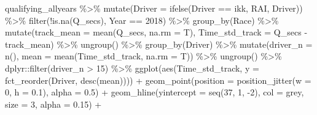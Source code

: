 \documentclass[
]{book}
\newenvironment{Shaded}{\begin{snugshade}}{\end{snugshade}}
\newcommand{\AttributeTok}[1]{\textcolor[rgb]{0.77,0.63,0.00}{#1}}
\newcommand{\DecValTok}[1]{\textcolor[rgb]{0.00,0.00,0.81}{#1}}
\newcommand{\FloatTok}[1]{\textcolor[rgb]{0.00,0.00,0.81}{#1}}
\newcommand{\FunctionTok}[1]{\textcolor[rgb]{0.00,0.00,0.00}{#1}}
\newcommand{\NormalTok}[1]{#1}
\newcommand{\SpecialCharTok}[1]{\textcolor[rgb]{0.00,0.00,0.00}{#1}}
\newcommand{\StringTok}[1]{\textcolor[rgb]{0.31,0.60,0.02}{#1}}
\begin{document}
\begin{Shaded}
\begin{Highlighting}[]
\NormalTok{qualifying\_allyears }\SpecialCharTok{\%\textgreater{}\%}
  \FunctionTok{mutate}\NormalTok{(}\AttributeTok{Driver =} \FunctionTok{ifelse}\NormalTok{(Driver }\SpecialCharTok{==} \StringTok{\textquotesingle{}ikk\textquotesingle{}}\NormalTok{, }\StringTok{\textquotesingle{}RAI\textquotesingle{}}\NormalTok{, Driver)) }\SpecialCharTok{\%\textgreater{}\%} 
  \FunctionTok{filter}\NormalTok{(}\SpecialCharTok{!}\FunctionTok{is.na}\NormalTok{(Q\_secs),}
\NormalTok{         Year }\SpecialCharTok{==} \DecValTok{2018}\NormalTok{) }\SpecialCharTok{\%\textgreater{}\%}
  \FunctionTok{group\_by}\NormalTok{(Race) }\SpecialCharTok{\%\textgreater{}\%}
  \FunctionTok{mutate}\NormalTok{(}\AttributeTok{track\_mean =} \FunctionTok{mean}\NormalTok{(Q\_secs, }\AttributeTok{na.rm =}\NormalTok{ T),}
         \AttributeTok{Time\_std\_track =}\NormalTok{ Q\_secs }\SpecialCharTok{{-}}\NormalTok{ track\_mean) }\SpecialCharTok{\%\textgreater{}\%} 
  \FunctionTok{ungroup}\NormalTok{() }\SpecialCharTok{\%\textgreater{}\%} 
  \FunctionTok{group\_by}\NormalTok{(Driver) }\SpecialCharTok{\%\textgreater{}\%} 
  \FunctionTok{mutate}\NormalTok{(}\AttributeTok{driver\_n =} \FunctionTok{n}\NormalTok{(),}
         \AttributeTok{mean =} \FunctionTok{mean}\NormalTok{(Time\_std\_track, }\AttributeTok{na.rm =}\NormalTok{ T)) }\SpecialCharTok{\%\textgreater{}\%}
  \FunctionTok{ungroup}\NormalTok{() }\SpecialCharTok{\%\textgreater{}\%}
\NormalTok{  dplyr}\SpecialCharTok{::}\FunctionTok{filter}\NormalTok{(driver\_n }\SpecialCharTok{\textgreater{}} \DecValTok{15}\NormalTok{) }\SpecialCharTok{\%\textgreater{}\%} 
  \FunctionTok{ggplot}\NormalTok{(}\FunctionTok{aes}\NormalTok{(Time\_std\_track, }\AttributeTok{y =} \FunctionTok{fct\_reorder}\NormalTok{(Driver, }\FunctionTok{desc}\NormalTok{(mean)))) }\SpecialCharTok{+}
  \FunctionTok{geom\_point}\NormalTok{(}\AttributeTok{position =} \FunctionTok{position\_jitter}\NormalTok{(}\AttributeTok{w =} \DecValTok{0}\NormalTok{, }\AttributeTok{h =} \FloatTok{0.1}\NormalTok{), }\AttributeTok{alpha =} \FloatTok{0.5}\NormalTok{) }\SpecialCharTok{+}
  \FunctionTok{geom\_hline}\NormalTok{(}\AttributeTok{yintercept =} \FunctionTok{seq}\NormalTok{(}\DecValTok{37}\NormalTok{, }\DecValTok{1}\NormalTok{, }\SpecialCharTok{{-}}\DecValTok{2}\NormalTok{), }\AttributeTok{col =} \StringTok{\textquotesingle{}grey\textquotesingle{}}\NormalTok{, }\AttributeTok{size =} \DecValTok{3}\NormalTok{, }\AttributeTok{alpha =} \FloatTok{0.15}\NormalTok{) }\SpecialCharTok{+}

\end{Highlighting}
\end{Shaded}
\end{document}
